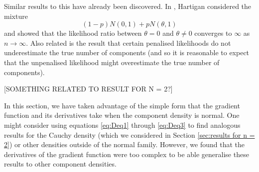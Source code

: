 		Similar results to this have already been discovered. In \cite{Hartigan1985-wn}, Hartigan considered the mixture 
		\begin{equation}
			(1 - p)N(0,1) + pN(\theta, 1)
		\end{equation}
		and showed that the likelihood ratio between $\theta = 0$ and $\theta \neq 0$ converges to $\infty$ as $n \rightarrow \infty$. Also related is the result \cite{Leroux1992-ek} that certain penalised likelihoods do not underestimate the true number of components (and so it is reasonable to expect that the unpenalised likelihood might overestimate the true number of components).

		[SOMETHING RELATED TO RESULT FOR N = 2?]

		In this section, we have taken advantage of the simple form that the gradient function and its derivatives take when the component density is normal. One might consider using equations \eqref{eq:Deq1} through \eqref{eq:Deq3} to find analogous results for the Cauchy density (which we considered in Section \ref{sec:results for n = 2}) or other densities outside of the normal family. However, we found that the derivatives of the gradient function were too complex to be able generalise these results to other component densities.





